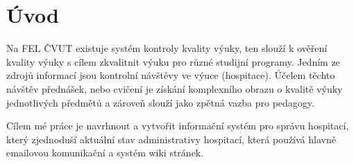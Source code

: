 \chapter{Úvod}

Na FEL ČVUT existuje systém kontroly kvality výuky, ten slouží k ověření kvality výuky s cílem zkvalitnit výuku pro různé studijní programy. Jedním ze zdrojů informací jsou kontrolní návštěvy ve výuce (hospitace). Účelem těchto návštěv přednášek, nebo cvičení je získání komplexního obrazu o kvalitě výuky jednotlivých předmětů a zároveň slouží jako zpětná vazba pro pedagogy.

Cílem mé práce je navrhnout a vytvořit informační systém pro správu hospitací, který zjednoduší aktuální stav administrativy hospitací, která používá hlavně emailovou komunikační a systém wiki stránek.